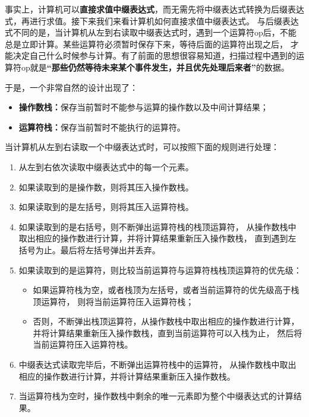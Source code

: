 事实上，计算机可以\textbf{直接求值中缀表达式}，而无需先将中缀表达式转换为后缀表达式，再进行求值。接下来我们来看计算机如何直接求值中缀表达式。
与后缀表达式不同的是，当计算机从左到右读取中缀表达式时，遇到一个运算符op后，不能总是立即计算。某些运算符必须暂时保存下来，等待后面的运算符出现之后，
才能决定自己什么时候参与计算。有了前面的思想很容易知道，扫描过程中遇到的运算符op就是\textbf{“那些仍然等待未来某个事件发生，并且优先处理后来者”}的数据。

于是，一个非常自然的设计出现了：

\begin{itemize}
    \item \textbf{操作数栈：}保存当前暂时不能参与运算的操作数以及中间计算结果；
    \item \textbf{运算符栈：}保存当前暂时不能执行的运算符。
\end{itemize}

当计算机从左到右读取一个中缀表达式时，可以按照下面的规则进行处理：

\begin{enumerate}
    \item 从左到右依次读取中缀表达式中的每一个元素。
    \item 如果读取到的是操作数，则将其压入操作数栈。
    \item 如果读取到的是左括号，则将其压入运算符栈。
    \item 如果读取到的是右括号，则不断弹出运算符栈的栈顶运算符，
    从操作数栈中取出相应的操作数进行计算，并将计算结果重新压入操作数栈，
    直到遇到左括号为止。最后将左括号弹出并丢弃。
    \item 如果读取到的是运算符，则比较当前运算符与运算符栈栈顶运算符的优先级：
    \begin{itemize}
        \item 如果运算符栈为空，或者栈顶为左括号，或者当前运算符的优先级高于栈顶运算符，
        则将当前运算符压入运算符栈；
        \item 否则，不断弹出栈顶运算符，从操作数栈中取出相应的操作数进行计算，
        并将计算结果重新压入操作数栈，直到当前运算符可以入栈为止，
        然后将当前运算符压入运算符栈。
    \end{itemize}
    \item 中缀表达式读取完毕后，不断弹出运算符栈中的运算符，
    从操作数栈中取出相应的操作数进行计算，并将计算结果重新压入操作数栈。
    \item 当运算符栈为空时，操作数栈中剩余的唯一元素即为整个中缀表达式的计算结果。
\end{enumerate}

